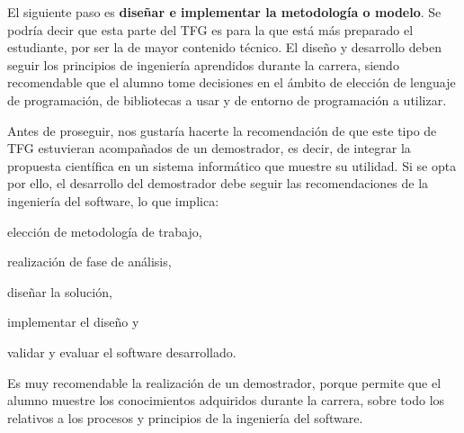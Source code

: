 El siguiente paso es \textbf{diseñar e implementar la metodología o modelo}. Se podría decir que esta parte del TFG es para la que está más preparado el estudiante, por ser la de mayor contenido técnico. El diseño y desarrollo deben seguir los principios de ingeniería aprendidos durante la carrera, siendo recomendable que el alumno tome decisiones en el ámbito de elección de lenguaje de programación, de bibliotecas a usar y de entorno de programación a utilizar.

Antes de proseguir, nos gustaría hacerte la recomendación de que este tipo de TFG estuvieran acompañados de un demostrador, es decir, de integrar la propuesta científica en un sistema informático que muestre su utilidad. Si se opta por ello, el desarrollo del demostrador debe seguir las recomendaciones de la ingeniería del software, lo que implica: \begin{enumerate*}[label=(\arabic*)]\item elección de metodología de trabajo, \item realización de fase de análisis, \item diseñar la solución, \item implementar el diseño y \item validar y evaluar el software desarrollado.\end{enumerate*} Es muy recomendable la realización de un demostrador, porque permite que el alumno muestre los conocimientos adquiridos durante la carrera, sobre todo los relativos a los procesos y principios de la ingeniería del software.

